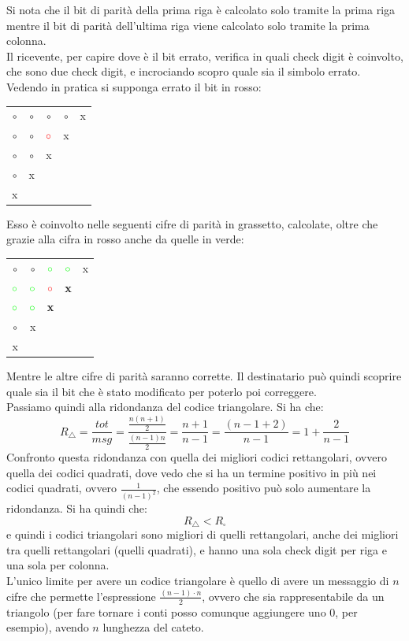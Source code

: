 \documentclass[a4paper,12pt, oneside]{book}
\begin{document}
Si nota che il bit di parità della prima riga è calcolato solo tramite la prima
riga mentre il bit di parità dell'ultima riga viene calcolato solo tramite la
prima colonna.\\
Il ricevente, per capire dove è il bit errato, verifica in quali check digit è
coinvolto, che sono due check digit, e incrociando scopro quale sia il simbolo
errato. Vedendo in pratica si supponga errato il bit in rosso:
\begin{table}[H]
  \centering
  \begin{tabular}{ccccc}
    $\circ$ & $\circ$ & $\circ$ &$\circ$  & x\\
    $\circ$ & $\circ$ & {$\color{red}\circ$}  & x&\\
    $\circ$ & $\circ$ & x&&\\
    $\circ$ &x&&&\\
    x&&&&
  \end{tabular}
\end{table}
Esso è coinvolto nelle seguenti cifre di parità in grassetto, calcolate, oltre
che grazie alla cifra in rosso anche da quelle in verde:
\begin{table}[H]
  \centering
  \begin{tabular}{ccccc}
    $\circ$ & $\circ$ &  ${\color{green}\circ}$&  ${\color{green}\circ}$ & x\\
    ${\color{green}\circ}$ & ${\color{green}\circ}$ & {$\color{red}\circ$}  & \textbf{x}&\\
    ${\color{green}\circ}$ &  ${\color{green}\circ}$ & \textbf{x}&&\\
    $\circ$ &x&&&\\
    x&&&&
  \end{tabular}
\end{table}
Mentre le altre cifre di parità saranno corrette. Il destinatario può quindi
scoprire quale sia il bit che è stato modificato per poterlo poi correggere.\\
Passiamo quindi alla ridondanza del codice triangolare.
Si ha che:
\[R_\triangle=\frac{tot}{msg}=\frac{\frac{n(n+1)}{2}}{\frac{(n-1)n}{2}}=
  \frac{n+1}{n-1}= \frac{(n-1+2)}{n-1}=1+\frac{2}{n-1}\]
Confronto questa ridondanza con quella dei migliori codici rettangolari, ovvero
quella dei codici quadrati, dove vedo che si ha un termine positivo in più nei
codici quadrati, ovvero $\frac{1}{(n-1)^2}$, che essendo positivo può solo
aumentare la ridondanza. Si ha quindi che:
\[R_\triangle<R_\square\]
e quindi i codici triangolari sono migliori di quelli
rettangolari, anche dei migliori tra quelli rettangolari (quelli quadrati), e
hanno una sola check digit per riga e una sola per colonna.\\
L'unico limite per avere un codice triangolare è quello di avere un
messaggio di $n$ cifre che permette l'espressione $\frac{(n-1)\cdot n}{2}$,
ovvero che sia rappresentabile da un triangolo (per fare tornare i conti posso
comunque aggiungere uno 0, per esempio), avendo $n$ lunghezza del cateto. 
\end{document}
